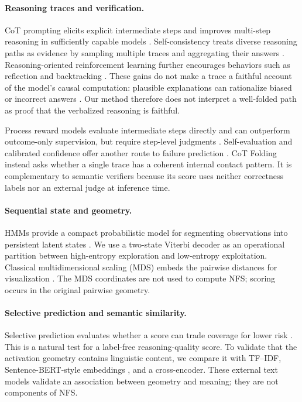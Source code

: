 \documentclass{article}
\newcommand{\nfs}{\textsc{NFS}}
\begin{document}
\paragraph{Reasoning traces and verification.}
CoT prompting elicits explicit intermediate steps and improves multi-step reasoning in sufficiently capable models \citep{wei2022chain}. Self-consistency treats diverse reasoning paths as evidence by sampling multiple traces and aggregating their answers \citep{wang2023selfconsistency}. Reasoning-oriented reinforcement learning further encourages behaviors such as reflection and backtracking \citep{deepseek2025r1}. These gains do not make a trace a faithful account of the model's causal computation: plausible explanations can rationalize biased or incorrect answers \citep{turpin2023unfaithful}. Our method therefore does not interpret a well-folded path as proof that the verbalized reasoning is faithful.

Process reward models evaluate intermediate steps directly and can outperform outcome-only supervision, but require step-level judgments \citep{lightman2023verify}. Self-evaluation and calibrated confidence offer another route to failure prediction \citep{kadavath2022know}. CoT Folding instead asks whether a single trace has a coherent internal contact pattern. It is complementary to semantic verifiers because its score uses neither correctness labels nor an external judge at inference time.

\paragraph{Sequential state and geometry.}
HMMs provide a compact probabilistic model for segmenting observations into persistent latent states \citep{rabiner1989hmm}. We use a two-state Viterbi decoder as an operational partition between high-entropy exploration and low-entropy exploitation. Classical multidimensional scaling (MDS) embeds the pairwise distances for visualization \citep{torgerson1952mds}. The MDS coordinates are not used to compute \nfs; scoring occurs in the original pairwise geometry.

\paragraph{Selective prediction and semantic similarity.}
Selective prediction evaluates whether a score can trade coverage for lower risk \citep{geifman2017selective}. This is a natural test for a label-free reasoning-quality score. To validate that the activation geometry contains linguistic content, we compare it with TF--IDF, Sentence-BERT-style embeddings \citep{reimers2019sentencebert}, and a cross-encoder. These external text models validate an association between geometry and meaning; they are not components of \nfs.
\end{document}
